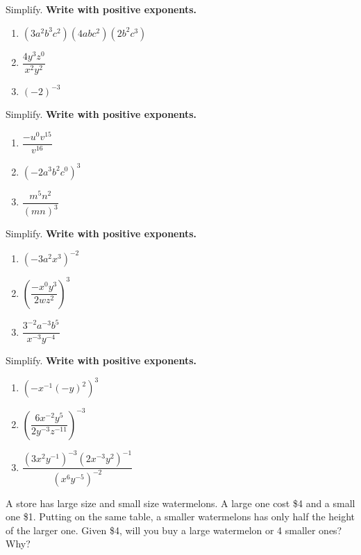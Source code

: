 \documentclass[en,11pt]{elegantbook}
\let\BeginKnitrBlock\begin \let\EndKnitrBlock\end
\begin{document}
\BeginKnitrBlock{exercise}
\protect\hypertarget{exr:unnamed-chunk-6}{}{\label{exr:unnamed-chunk-6} }
Simplify. \textbf{Write with positive exponents.}

\begin{enumerate}
\def\labelenumi{\arabic{enumi}.}

\item
  \((3a^2b^3c^2)(4abc^2)(2b^2c^3)\)
\item
  \(\dfrac{4y^3z^0}{x^2y^2}\)
\item
  \((-2)^{-3}\)
\end{enumerate}
\EndKnitrBlock{exercise}

\BeginKnitrBlock{exercise}
\protect\hypertarget{exr:unnamed-chunk-7}{}{\label{exr:unnamed-chunk-7} }
Simplify. \textbf{Write with positive exponents.}

\begin{enumerate}
\def\labelenumi{\arabic{enumi}.}

\item
  \(\dfrac{-u^0v^{15}}{v^{16}}\)
\item
  \((-2a^3b^2c^0)^3\)
\item
  \(\dfrac{m^5 n^{2}}{(mn)^3}\)
\end{enumerate}
\EndKnitrBlock{exercise}

\BeginKnitrBlock{exercise}
\protect\hypertarget{exr:unnamed-chunk-8}{}{\label{exr:unnamed-chunk-8} }
Simplify. \textbf{Write with positive exponents.}

\begin{enumerate}
\def\labelenumi{\arabic{enumi}.}

\item
  \((-3a^2x^3)^{-2}\)
\item
  \(\left(\dfrac{-x^0y^3}{2wz^2}\right)^3\)
\item
  \(\dfrac{3^{-2}a^{-3}b^5}{x^{-3}y^{-4}}\)
\end{enumerate}
\EndKnitrBlock{exercise}

\BeginKnitrBlock{exercise}
\protect\hypertarget{exr:unnamed-chunk-9}{}{\label{exr:unnamed-chunk-9} }
Simplify. \textbf{Write with positive exponents.}

\begin{enumerate}
\def\labelenumi{\arabic{enumi}.}

\item
  \(\left(-x^{-1}(-y)^2\right)^3\)
\item
  \(\left(\dfrac{6x^{-2}y^5}{2y^{-3}z^{-11}}\right)^{-3}\)
\item
  \(\dfrac{(3 x^{2} y^{-1})^{-3}(2 x^{-3} y^{2})^{-1}}{(x^{6} y^{-5})^{-2}}\)
\end{enumerate}
\EndKnitrBlock{exercise}

\BeginKnitrBlock{exercise}
\protect\hypertarget{exr:unnamed-chunk-10}{}{\label{exr:unnamed-chunk-10} }
A store has large size and small size watermelons. A large one cost \$4 and a small one \$1. Putting on the same table, a smaller watermelons has only half the height of the larger one. Given \$4, will you buy a large watermelon or 4 smaller ones? Why?
\EndKnitrBlock{exercise}


\end{document}
